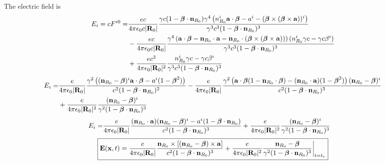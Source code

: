 The electric field is
\begin{align}
    E_i =cF^{i0} = & \frac{ec}{4\pi\epsilon_0c|{\bf R}_0|}\frac{\gamma c(1-{\boldsymbol\beta}\cdot{\bf n}_{R_0})\gamma^4\left(n_{R_0}^i{\bf a}\cdot{\boldsymbol\beta}-a^i-({\boldsymbol\beta}\times({\boldsymbol\beta}\times{\bf a}))^i\right)}{\gamma^3c^3(1-{\boldsymbol\beta}\cdot{\bf n}_{R_0})^3}\nonumber                     \\
                   & -\frac{ec}{4\pi\epsilon_0c|{\bf R}_0|}\frac{\gamma^4 \left({\bf a}\cdot{\boldsymbol\beta}-{\bf n}_{R_0}\cdot{\bf a}- {\bf n}_{R_0}\cdot({\boldsymbol\beta}\times({\boldsymbol\beta}\times {\bf a}))\right)(n_{R_0}^i\gamma c-\gamma c\beta^i)}{\gamma^3c^3(1-{\boldsymbol\beta}\cdot{\bf n}_{R_0})^3}\nonumber \\
                   & +\frac{ec^2}{4\pi\epsilon_0 |{\bf R}_0|^2}\frac{n_{R_0}^i\gamma c-\gamma c\beta^i}{\gamma^3c^3(1-{\boldsymbol\beta}\cdot{\bf n}_{R_0})^3}\end{align}
\begin{align}
    E_i  = & \frac{e}{4\pi\epsilon_0|{\bf R}_0|}\frac{\gamma^2 \left(({\bf n}_{R_0}-{\boldsymbol\beta})^i{\bf a}\cdot{\boldsymbol\beta}-a^i(1-{\boldsymbol\beta}^2)\right)}{c^2(1-{\boldsymbol\beta}\cdot{\bf n}_{R_0})^2} -\frac{e}{4\pi\epsilon_0|{\bf R}_0|}\frac{\gamma^2 \left({\bf a}\cdot{\boldsymbol\beta}(1-{\bf n}_{R_0}\cdot{\boldsymbol\beta})-({\bf n}_{R_0}\cdot{\bf a})(1-{\boldsymbol\beta}^2)\right)({\bf n}_{R_0}-{\boldsymbol\beta})^i}{c^2(1-{\boldsymbol\beta}\cdot{\bf n}_{R_0})^3}\nonumber \\
           & +\frac{e}{4\pi\epsilon_0 |{\bf R}_0|^2}\frac{({\bf n}_{R_0}-{\boldsymbol\beta})^i}{\gamma^2(1-{\boldsymbol\beta}\cdot{\bf n}_{R_0})^3}
\end{align}
\begin{align}
    E_i  = & \frac{e}{4\pi\epsilon_0|{\bf R}_0|}\frac{ ({\bf n}_{R_0}\cdot{\bf a})({\bf n}_{R_0}-{\boldsymbol\beta})^i-a^i(1-{\boldsymbol\beta}\cdot{\bf n}_{R_0})}{c^2(1-{\boldsymbol\beta}\cdot{\bf n}_{R_0})^3} +\frac{e}{4\pi\epsilon_0 |{\bf R}_0|^2}\frac{({\bf n}_{R_0}-{\boldsymbol\beta})^i}{\gamma^2(1-{\boldsymbol\beta}\cdot{\bf n}_{R_0})^3}
\end{align}
\begin{align}
    \boxed{{\bf E}({\bf x},t)={\frac{e}{4\pi\epsilon_0|{\bf R}_0|}\frac{{\bf n}_{R_0}\times[({\bf n}_{R_0}-{\boldsymbol\beta})\times {\bf a}]}{c^2(1-{\boldsymbol\beta}\cdot{\bf n}_{R_0})^3}+\frac{e}{4\pi\epsilon_0 |{\bf R}_0|^2}\frac{{\bf n}_{R_0}-{\boldsymbol\beta}}{\gamma^2(1-{\boldsymbol\beta}\cdot{\bf n}_{R_0})^3}\,\vline}_{\,t=t_r}}
\end{align}

